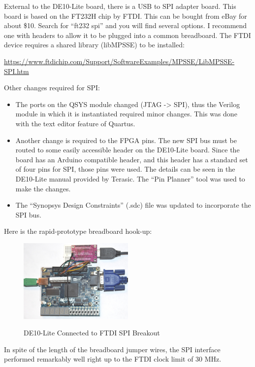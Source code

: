 External to the DE10-Lite board, there is a USB to SPI adapter board.  This board is based on the FT232H chip by FTDI.  This can be bought from eBay for about \$10.  Search for ``ft232 spi'' and you will find several options.  I recommend one with headers to allow it to be plugged into a common breadboard.  The FTDI device requires a shared library (libMPSSE) to be installed:

\url{https://www.ftdichip.com/Support/SoftwareExamples/MPSSE/LibMPSSE-SPI.htm}

Other changes required for SPI:

\begin{itemize}
	\item The ports on the QSYS module changed (JTAG -> SPI), thus the Verilog module in which it is instantiated required minor changes.  This was done with the text editor feature of Quartus.
    \item Another change is required to the FPGA pins.  The new SPI bus must be routed to some easily accessible header on the DE10-Lite board.  Since the board has an Arduino compatible header, and this header has a standard set of four pins for SPI, those pins were used.  The details can be seen in the DE10-Lite manual provided by Terasic.  The ``Pin Planner'' tool was used to make the changes.
    \item The ``Synopsys Design Constraints'' (.sdc) file was updated to incorporate the SPI bus.
\end{itemize}

Here is the rapid-prototype breadboard hook-up:

\begin{figure}[h]
	\centering
	\includegraphics[width=0.5\textwidth]{images/de10_spi}
	\centering\bfseries
	\caption{DE10-Lite Connected to FTDI SPI Breakout}
\end{figure}

In spite of the length of the breadboard jumper wires, the SPI interface performed remarkably well right up to the FTDI clock limit of 30 MHz.









